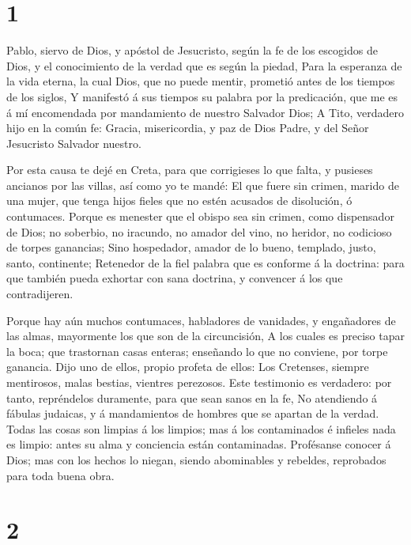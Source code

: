 \hypertarget{section}{%
\section{1}\label{section}}

 Pablo, siervo de Dios, y apóstol de Jesucristo, según la fe
de los escogidos de Dios, y el conocimiento de la verdad que es según la
piedad,  Para la esperanza de la vida eterna, la cual Dios,
que no puede mentir, prometió antes de los tiempos de los siglos,
 Y manifestó á sus tiempos su palabra por la predicación,
que me es á mí encomendada por mandamiento de nuestro Salvador Dios;
 A Tito, verdadero hijo en la común fe: Gracia,
misericordia, y paz de Dios Padre, y del Señor Jesucristo Salvador
nuestro.

 Por esta causa te dejé en Creta, para que corrigieses lo
que falta, y pusieses ancianos por las villas, así como yo te mandé:
 El que fuere sin crimen, marido de una mujer, que tenga
hijos fieles que no estén acusados de disolución, ó contumaces.
 Porque es menester que el obispo sea sin crimen, como
dispensador de Dios; no soberbio, no iracundo, no amador del vino, no
heridor, no codicioso de torpes ganancias;  Sino hospedador,
amador de lo bueno, templado, justo, santo, continente; 
Retenedor de la fiel palabra que es conforme á la doctrina: para que
también pueda exhortar con sana doctrina, y convencer á los que
contradijeren.

 Porque hay aún muchos contumaces, habladores de vanidades,
y engañadores de las almas, mayormente los que son de la circuncisión,
 A los cuales es preciso tapar la boca; que trastornan
casas enteras; enseñando lo que no conviene, por torpe ganancia.
 Dijo uno de ellos, propio profeta de ellos: Los Cretenses,
siempre mentirosos, malas bestias, vientres perezosos. 
Este testimonio es verdadero: por tanto, repréndelos duramente, para que
sean sanos en la fe,  No atendiendo á fábulas judaicas, y á
mandamientos de hombres que se apartan de la verdad.  Todas
las cosas son limpias á los limpios; mas á los contaminados é infieles
nada es limpio: antes su alma y conciencia están contaminadas.
 Profésanse conocer á Dios; mas con los hechos lo niegan,
siendo abominables y rebeldes, reprobados para toda buena obra.

\hypertarget{section-1}{%
\section{2}\label{section-1}}

